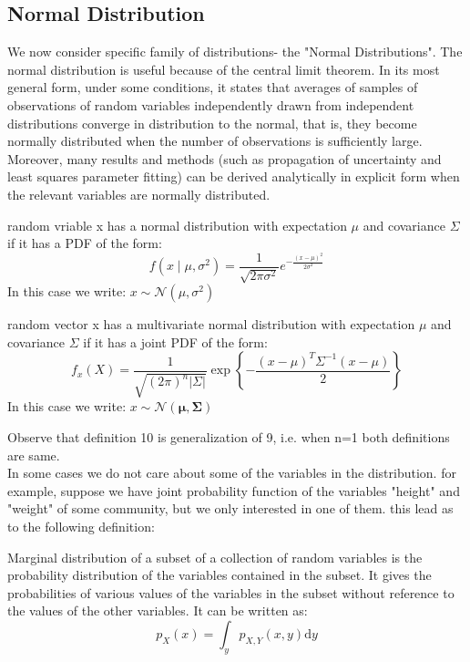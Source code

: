 \documentclass[11pt]{article}
\begin{document}
\subsection{Normal Distribution}
We now consider specific family of distributions- the "Normal Distributions". The normal distribution is useful because of the central limit theorem. In its most general form, under some conditions, it states that averages of samples of observations of random variables independently drawn from independent distributions converge in distribution to the normal, that is, they become normally distributed when the number of observations is sufficiently large. Moreover, many results and methods (such as propagation of uncertainty and least squares parameter fitting) can be derived analytically in explicit form when the relevant variables are normally distributed. 

\begin{definition}
random vriable x has a normal distribution with expectation $\mu$ and covariance $\Sigma$ if it has a PDF of the form:
$$f(x \mid \mu, \sigma^2) = \frac{1}{\sqrt{2\pi\sigma^2} } e^{ -\frac{(x-\mu)^2}{2\sigma^2} } $$
In this case we write: $x\sim\mathcal{N}({\mu},{\sigma^2})$

\end{definition}
\begin{definition}
random vector x has a multivariate normal distribution with expectation $\mu$ and covariance $\Sigma$ if it has a joint PDF of the form:
$$f_{x}\left(X\right)=\frac{1}{\sqrt{\left(2\pi\right)^{n}\left|\Sigma\right|}}\exp\left\{ -\frac{\left(x-\mu\right)^{T}\Sigma^{-1}\left(x-\mu\right)}{2}\right\} $$
In this case we write: $x\sim\mathcal{N}(\boldsymbol{\mu},\boldsymbol{\Sigma})$
\end{definition}

Observe that definition 10 is generalization of 9, i.e. when n=1 both definitions are same.
\\

In some cases we do not care about some of the variables in the distribution. for example, suppose we have joint probability function of the variables "height" and "weight" of some community, but we only interested in one of them. this lead as to the following definition:

\begin{definition}
Marginal distribution of a subset of a collection of random variables is the probability distribution of the variables contained in the subset. It gives the probabilities of various values of the variables in the subset without reference to the values of the other variables. It can be written as:
$$p_{X}(x)=\int_{y}p_{X,Y}(x,y)\mathrm{d}y$$
\end{definition}
\end{document}
